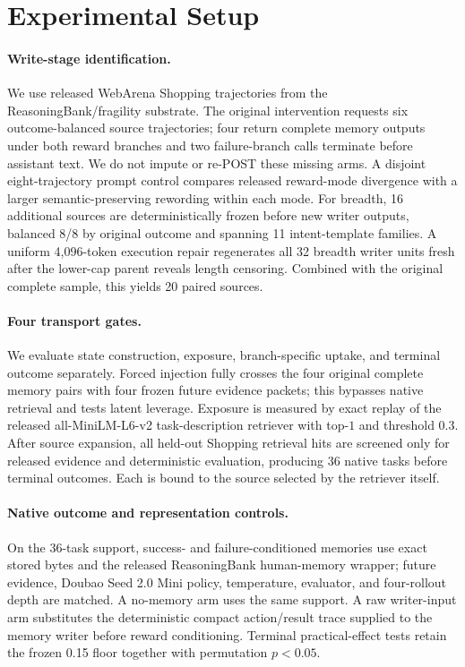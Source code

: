 \section{Experimental Setup}
\label{sec:setup}
\paragraph{Write-stage identification.}
We use released WebArena Shopping trajectories from the ReasoningBank/fragility substrate. The original intervention requests six outcome-balanced source trajectories; four return complete memory outputs under both reward branches and two failure-branch calls terminate before assistant text. We do not impute or re-POST these missing arms. A disjoint eight-trajectory prompt control compares released reward-mode divergence with a larger semantic-preserving rewording within each mode. For breadth, 16 additional sources are deterministically frozen before new writer outputs, balanced 8/8 by original outcome and spanning 11 intent-template families. A uniform 4,096-token execution repair regenerates all 32 breadth writer units fresh after the lower-cap parent reveals length censoring. Combined with the original complete sample, this yields 20 paired sources.

\paragraph{Four transport gates.}
We evaluate state construction, exposure, branch-specific uptake, and terminal outcome separately. Forced injection fully crosses the four original complete memory pairs with four frozen future evidence packets; this bypasses native retrieval and tests latent leverage. Exposure is measured by exact replay of the released all-MiniLM-L6-v2 task-description retriever with top-$1$ and threshold 0.3. After source expansion, all held-out Shopping retrieval hits are screened only for released evidence and deterministic evaluation, producing 36 native tasks before terminal outcomes. Each is bound to the source selected by the retriever itself.

\paragraph{Native outcome and representation controls.}
On the 36-task support, success- and failure-conditioned memories use exact stored bytes and the released ReasoningBank human-memory wrapper; future evidence, Doubao Seed 2.0 Mini policy, temperature, evaluator, and four-rollout depth are matched. A no-memory arm uses the same support. A raw writer-input arm substitutes the deterministic compact action/result trace supplied to the memory writer before reward conditioning. Terminal practical-effect tests retain the frozen 0.15 floor together with permutation $p<0.05$.

